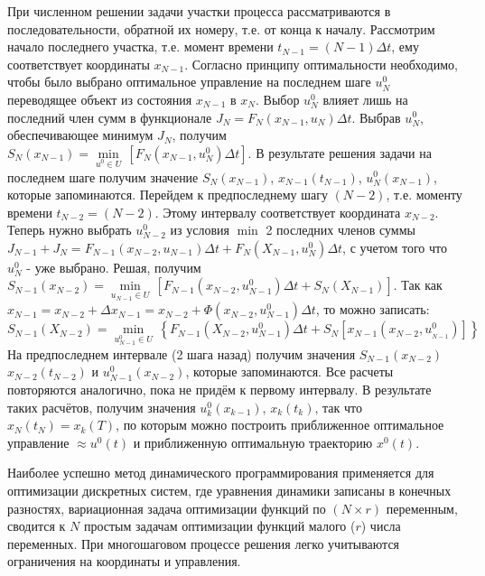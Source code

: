 \documentclass[preprint,russian,a5paper,10pt,twoside,mediummath]{ncc}
\begin{document}
\par При численном решении задачи участки процесса рассматриваются в последовательности, обратной их номеру, т.е. от конца к началу. Рассмотрим начало последнего участка, т.е. момент времени ${{t}_{N-1}}=\left( N-1 \right)\Delta t$, ему соответствует координаты ${{x}_{N-1}}$. Согласно принципу оптимальности необходимо, чтобы было выбрано оптимальное управление на последнем шаге $u_{N}^{0}$ переводящее объект из состояния ${{x}_{N-1}}$ в ${{x}_{N}}$. Выбор $u_{N}^{0}$ влияет лишь на последний член сумм в функционале ${{J}_{N}}={{F}_{N}}\left( {{x}_{N-1}},{{u}_{N}} \right)\Delta t$. Выбрав $u_{N}^{0}$, обеспечивающее минимум ${{J}_{N}}$, получим ${{S}_{N}}\left( {{x}_{N-1}} \right)=\underset{{{u}^{0}}\in U}{\mathop{\min }}\,\left[ {{F}_{N}}\left( {{x}_{N-1}},u_{N}^{0} \right)\Delta t \right]$. В результате решения задачи на последнем шаге получим значение ${{S}_{N}}\left( {{x}_{N-1}} \right)$, ${{x}_{N-1}}\left( {{t}_{N-1}} \right)$, $u_{N}^{0}\left( {{x}_{N-1}} \right)$, которые запоминаются. Перейдем к предпоследнему шагу $\left( N-2 \right)$, т.е. моменту времени ${{t}_{N-2}}=\left( N-2 \right)$. Этому интервалу соответствует координата ${{x}_{N-2}}$. Теперь нужно выбрать $u_{N-2}^{0}$ из условия $\min $ 2 последних членов суммы
\\${{J}_{N-1}}+{{J}_{N}}={{F}_{N-1}}\left( {{x}_{N-2}},{{u}_{N-1}} \right)\Delta t+{{F}_{N}}\left( {{X}_{N-1}},u_{N}^{0} \right)\Delta t$, с учетом того что $u_{N}^{0}$ - уже выбрано. Решая, получим 
${{S}_{N-1}}\left( {{x}_{N-2}} \right)=\underset{{{u}_{N-1}}\in U}{\mathop{\min }}\,\left[ {{F}_{N-1}}\left( {{x}_{N-2}},u_{N-1}^{0} \right)\Delta t+{{S}_{N}}\left( {{X}_{N-1}} \right) \right]$. Так как ${{x}_{N-1}}={{x}_{N-2}}+\Delta {{x}_{N-1}}={{x}_{N-2}}+\Phi \left( {{x}_{N-2}},u_{N-1}^{0} \right)\Delta t$, то можно записать: 
\\${{S}_{N-1}}\left( {{X}_{N-2}} \right)=\underset{u_{N-1}^{0}\in U}{\mathop{\min }}\,\left\{ {{F}_{N-1}}\left( {{X}_{N-2}},u_{N-1}^{0} \right)\Delta t+{{S}_{N}}\left[ {{x}_{N-1}}\left( {{x}_{N-2}},u_{_{N-1}}^{0} \right) \right] \right\}$ 
\\На предпоследнем интервале (2 шага назад) получим значения ${{S}_{N-1}}\left( {{x}_{N-2}} \right)$ ${{x}_{N-2}}\left( {{t}_{N-2}} \right)$ и $u_{N-1}^{0}\left( {{x}_{N-2}} \right)$, которые запоминаются. Все расчеты повторяются аналогично, пока не придём к первому интервалу. В результате таких расчётов, получим значения $u_{k}^{0}\left( {{x}_{k-1}} \right)$, ${{x}_{k}}\left( {{t}_{k}} \right)$, так что ${{x}_{N}}\left( {{t}_{N}} \right)={{x}_{k}}\left( T \right)$, по которым можно построить приближенное оптимальное управление $\approx {{u}^{0}}\left( t \right)$ и приближенную оптимальную траекторию ${{x}^{0}}\left( t \right)$.
\par Наиболее успешно метод динамического программирования применяется для оптимизации дискретных систем, где уравнения динамики записаны в конечных разностях, вариационная задача оптимизации функций по $\left( N\times r \right)$ переменным, сводится к $N$ простым задачам оптимизации функций малого ($r$) числа переменных. При многошаговом процессе решения легко учитываются ограничения на координаты и управления. 
\clearpage
\end{document}
